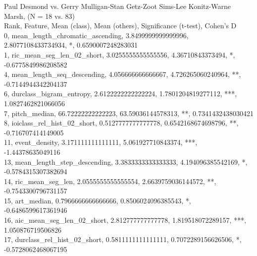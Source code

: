 Paul Desmond vs. Gerry Mulligan-Stan Getz-Zoot Sims-Lee Konitz-Warne Marsh, (N = 18 vs. 83)\\
Rank, Feature, Mean (class), Mean (others), Significance (t-test), Cohen's D\\
0, mean_length_chromatic_ascending, 3.8499999999999996, 2.8077108433734934, *, 0.6590007248283031\\
1, ric_mean_seg_len_02_short, 3.0255555555555556, 4.36710843373494, *, -0.6775849986208582\\
4, mean_length_seq_descending, 4.056666666666667, 4.726265060240964, **, -0.7144944342204137\\
6, durclass_bigram_entropy, 2.6122222222222224, 1.7801204819277112, ***, 1.0827462821066056\\
7, pitch_median, 66.72222222222223, 63.59036144578313, **, 0.7341432438030421\\
8, ioiclass_rel_hist_02_short, 0.5127777777777778, 0.6542168674698796, **, -0.716707414149005\\
11, event_density, 3.171111111111111, 5.061927710843374, ***, -1.44378635049116\\
13, mean_length_step_descending, 3.3833333333333333, 4.194096385542169, *, -0.5784315307382694\\
14, ric_mean_seg_len, 2.0555555555555554, 2.6639759036144572, **, -0.7543300796731157\\
15, art_median, 0.7966666666666666, 0.8506024096385543, *, -0.6486599617361946\\
16, aic_mean_seg_len_02_short, 2.812777777777778, 1.819518072289157, ***, 1.050876719506826\\
17, durclass_rel_hist_02_short, 0.5811111111111111, 0.7072289156626506, *, -0.5728062468067195\\
